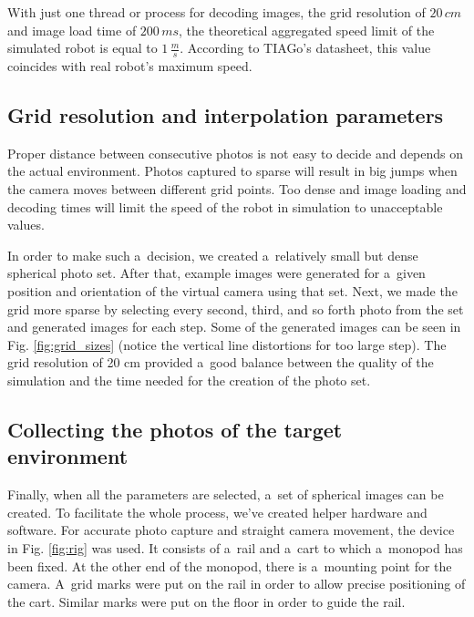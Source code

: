 \documentclass[conference]{ieeetran}
\begin{document}
With just one thread or process for decoding images, the grid resolution of $20\,cm$ and image load time of $200\,ms$, the theoretical aggregated speed limit of the simulated robot is equal to $1\,\frac{m}{s}$.
According to TIAGo's datasheet, this value coincides with real robot's maximum speed.

\subsection{Grid resolution and interpolation parameters}

Proper distance between consecutive photos is not easy to decide and depends on the
actual environment. Photos captured to sparse will result in big jumps when the camera
moves between different grid points. Too dense and image loading and decoding
times will limit the speed of the robot in simulation to unacceptable values.

In order to make such a~decision, we created a~relatively small but dense spherical photo set.
After that, example images were generated for a~given position and orientation of the virtual camera using that set.
Next, we made the grid more sparse by selecting every second, third, and so forth photo from the set and generated images for each step.
Some of the generated images can be seen in Fig. \ref{fig:grid_sizes} (notice the vertical line distortions for too large step).
The grid resolution of 20 cm provided a~good balance between the quality of the simulation and the time needed for the creation of the photo set.

\subsection{Collecting the photos of the target environment}

Finally, when all the parameters are selected, a~set of spherical images can be created.
To facilitate the whole process, we've created helper hardware and software.
For accurate photo capture and straight camera movement, the device in Fig. \ref{fig:rig} was used.
It consists of a~rail and a~cart to which a~monopod has been fixed.
At the other end of the monopod, there is a~mounting point for the camera.
A~grid marks were put on the rail in order to allow precise positioning of the cart.
Similar marks were put on the floor in order to guide the rail.
\end{document}
